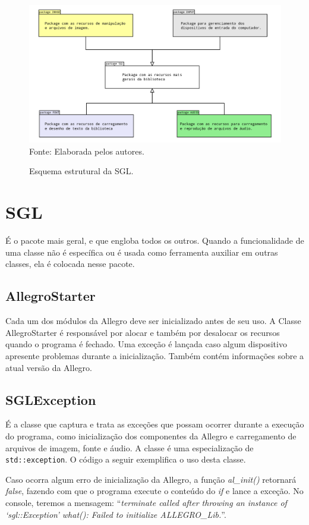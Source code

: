 \begin{figure}[H]
    \centering
     \caption{Esquema estrutural da SGL. }
    \label{pacotes}
    \includegraphics[scale = 0.2]{Imagens/pacotes.png}
    \\Fonte: Elaborada pelos autores.
\end{figure}
%
%
%
\section{SGL}
%
%
É o pacote mais geral, e que engloba todos os outros. Quando a funcionalidade de uma classe não é específica ou é usada como ferramenta auxiliar em outras classes, ela é colocada nesse pacote.
%
\subsection{AllegroStarter}
%
Cada um dos módulos da Allegro deve ser inicializado antes de seu uso. A Classe AllegroStarter é responsável por alocar e também por desalocar os recursos quando o programa é fechado. Uma exceção é lançada caso algum dispositivo apresente problemas durante a inicialização. Também contém informações sobre a atual versão da Allegro. 
%
%
\subsection{SGLException}
%
É a classe que captura e trata as exceções que possam ocorrer durante a execução do programa, como inicialização dos componentes da Allegro e carregamento de arquivos de imagem, fonte e áudio. A classe é uma especialização de \texttt{std::exception}. O código a seguir exemplifica o uso desta classe.
%

%
\par 
Caso ocorra algum erro de inicialização da Allegro, a função \textit{al\_init()} retornará \textit{false}, fazendo com que o programa execute o conteúdo do \textit{if} e lance a exceção. No console, teremos a mensagem:  ``\textit{terminate called after throwing an instance of `sgl::Exception'
what(): Failed to initialize ALLEGRO\_Lib.}''.
%
%
